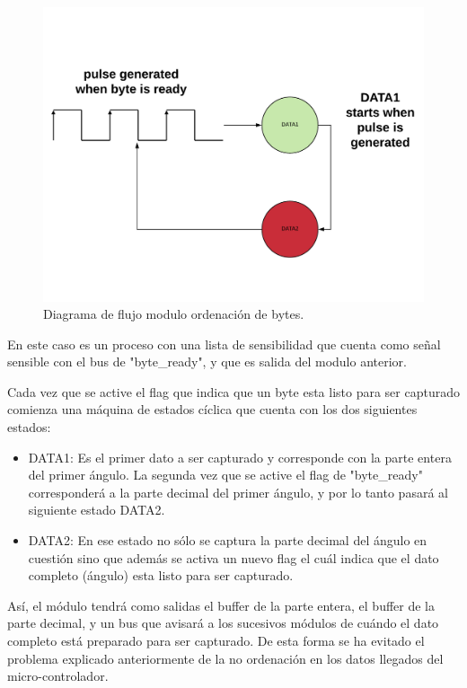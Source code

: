 \begin{figure}[H]
	\center
	\includegraphics[scale=0.5]{imagenes/Balancing_robot/arrange_angle.pdf}
	\caption{Diagrama de flujo modulo ordenación de bytes.}
	\label{fig:arrange_angle}
\end{figure}



En este caso es un proceso con una lista de sensibilidad que cuenta como señal sensible con el bus de "byte\_ready", y que es salida del modulo anterior. \newline

Cada vez que se active el flag que indica que un byte esta listo para ser capturado comienza una máquina de estados cíclica que cuenta con los dos siguientes estados:

\begin{itemize}
	 \item DATA1: Es el primer dato a ser capturado y corresponde con la parte entera del primer ángulo. La segunda vez que se active el flag de "byte\_ready" corresponderá a la parte decimal del primer ángulo, y por lo tanto pasará al siguiente estado DATA2.
	 \item DATA2: En ese estado no sólo se captura la parte decimal del ángulo en cuestión sino que además se activa un nuevo flag el cuál indica que el dato completo (ángulo) esta listo para ser capturado. 
\end{itemize}

Así, el módulo tendrá como salidas el buffer de la parte entera, el buffer de la parte decimal, y un bus que avisará a los sucesivos módulos de cuándo el dato completo está preparado para ser capturado. De esta forma se ha evitado el problema explicado anteriormente de la no ordenación en los datos llegados del micro-controlador.  \newline

